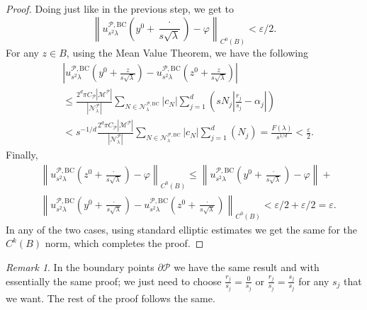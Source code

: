 \documentclass{amsart}
\theoremstyle{definition}
\theoremstyle{remark}
\newtheorem{remark}[theorem]{Remark}
\newcommand{\ep}{\varepsilon}
\newcommand{\vp}{\varphi}
\renewcommand\leq\leqslant
\numberwithin{equation}{section}
\theoremstyle{definition}
\theoremstyle{remark}
\begin{document}
\begin{proof}
	Doing just like in the previous step, we get to  \begin{equation}
		\left\|u_{s^2\lambda}^{\mathcal{P},\mathrm{BC}}\left(y^0+\frac{\cdot}{s\sqrt{\lambda}}\right)-\vp\right\|_{C^0(B)}<\ep/2.
	\end{equation}For any $z\in B$, using the Mean Value Theorem, we have the following \begin{equation}\begin{aligned}
			&\left|u_{s^2\lambda}^{\mathcal{P},\mathrm{BC}}\left(y^0+\frac{z}{s\sqrt{\lambda}}\right)-u_{s^2\lambda}^{\mathcal{P},\mathrm{BC}}\left(z^0+\frac{z}{s\sqrt{\lambda}}\right)\right| \\&\leq
			\frac{2^d\pi C_{\mathcal{P}}|\mathcal{M}^{\mathcal{P}}|}{\left|\mathcal{N}_{\lambda}^{\mathcal{P}}\right|}\sum_{N\in \mathcal{N}_{\lambda}^{\mathcal{P},\mathrm{BC}}}|c_N| \sum_{j=1}^d\left(sN_j\left|\frac{r_j}{s_j}-\alpha_j\right|\right)\\
			&<s^{-1/d}\frac{2^d\pi C_{\mathcal{P}}|\mathcal{M}^{\mathcal{P}}|}{\left|\mathcal{N}_{\lambda}^{\mathcal{P}}\right|}\sum_{N\in \mathcal{N}_{\lambda}^{\mathcal{P},\mathrm{BC}}}|c_N| \sum_{j=1}^d\left(N_j\right)=\frac{F(\lambda)}{s^{1/d}}<\frac{\ep}{2}.
		\end{aligned}
	\end{equation}Finally, 
	\begin{equation}\begin{aligned}
			&\left\|u_{s^2\lambda}^{\mathcal{P},\mathrm{BC}}\left(z^0+\frac{\cdot}{s\sqrt{\lambda}}\right)-\vp\right\|_{C^0(B)}\leq\left\|u_{s^2\lambda}^{\mathcal{P},\mathrm{BC}}\left(y^0+\frac{\cdot}{s\sqrt{\lambda}}\right)-\vp\right\|+ \\&\left\|u_{s^2\lambda}^{\mathcal{P},\mathrm{BC}}\left(y^0+\frac{\cdot}{s\sqrt{\lambda}}\right)-u_{s^2\lambda}^{\mathcal{P},\mathrm{BC}}\left(z^0+\frac{\cdot}{s\sqrt{\lambda}}\right)\right\|_{C^0(B)}<\ep/2+\ep/2=\ep.
	\end{aligned}\end{equation}
	In any of the two cases, using standard elliptic estimates we get the same for the $C^k\left(B\right)$ norm, which completes the proof. 
\end{proof}

\begin{remark}
In the boundary points $\partial \mathcal{P}$ we have the same result and with essentially the same proof; we just need to choose $\frac{r_j}{s_j}=\frac{0}{s_j}$ or $\frac{r_j}{s_j}=\frac{s_j}{s_j}$ for any $s_j$ that we want. The rest of the proof follows the same.  
\end{remark}
\end{document}
